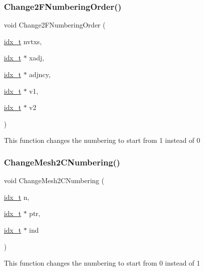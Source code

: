 \subsubsection{\texorpdfstring{Change2\+F\+Numbering\+Order()}{Change2FNumberingOrder()}}
{\footnotesize\ttfamily void Change2\+F\+Numbering\+Order (\begin{DoxyParamCaption}\item[{\hyperlink{a00876_aaa5262be3e700770163401acb0150f52}{idx\+\_\+t}}]{nvtxs,  }\item[{\hyperlink{a00876_aaa5262be3e700770163401acb0150f52}{idx\+\_\+t} $\ast$}]{xadj,  }\item[{\hyperlink{a00876_aaa5262be3e700770163401acb0150f52}{idx\+\_\+t} $\ast$}]{adjncy,  }\item[{\hyperlink{a00876_aaa5262be3e700770163401acb0150f52}{idx\+\_\+t} $\ast$}]{v1,  }\item[{\hyperlink{a00876_aaa5262be3e700770163401acb0150f52}{idx\+\_\+t} $\ast$}]{v2 }\end{DoxyParamCaption})}

This function changes the numbering to start from 1 instead of 0 \mbox{\label{a00200_ac325b86234ebda623e1b8c3f555196d2}} 
\subsubsection{\texorpdfstring{Change\+Mesh2\+C\+Numbering()}{ChangeMesh2CNumbering()}}
{\footnotesize\ttfamily void Change\+Mesh2\+C\+Numbering (\begin{DoxyParamCaption}\item[{\hyperlink{a00876_aaa5262be3e700770163401acb0150f52}{idx\+\_\+t}}]{n,  }\item[{\hyperlink{a00876_aaa5262be3e700770163401acb0150f52}{idx\+\_\+t} $\ast$}]{ptr,  }\item[{\hyperlink{a00876_aaa5262be3e700770163401acb0150f52}{idx\+\_\+t} $\ast$}]{ind }\end{DoxyParamCaption})}

This function changes the numbering to start from 0 instead of 1 \mbox{\label{a00200_a9ce41505b3d76a92b195e3d94c3f09e8}} 
